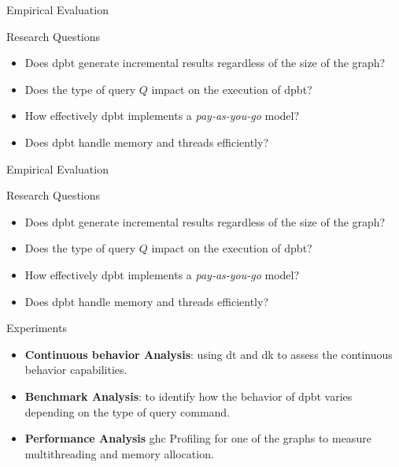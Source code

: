 \begin{frame}[fragile]{Empirical Evaluation}
  \begin{block}{Research Questions}
    \begin{itemize}
        \item Does \acrshort{dpbt} generate incremental results regardless of the size of the graph?
        \item Does the type of query $Q$ impact on the execution of \acrshort{dpbt}?
        \item How effectively \acrshort{dpbt} implements a \emph{pay-as-you-go} model?
        \item Does \acrshort{dpbt} handle memory and threads efficiently?
    \end{itemize}        
  \end{block}
\end{frame}

\begin{frame}[fragile]{Empirical Evaluation}
  \begin{block}{Research Questions}
    \begin{itemize}
        \item Does \acrshort{dpbt} generate incremental results regardless of the size of the graph?
        \item Does the type of query $Q$ impact on the execution of \acrshort{dpbt}?
        \item How effectively \acrshort{dpbt} implements a \emph{pay-as-you-go} model?
        \item Does \acrshort{dpbt} handle memory and threads efficiently?
    \end{itemize}        
  \end{block}
  \begin{block}{Experiments}
    \begin{itemize}
      \item \textbf{Continuous behavior Analysis}: using \acrshort{dt} and \acrshort{dk} to assess the continuous behavior capabilities.
      \item \textbf{Benchmark Analysis}: to identify how the behavior of \acrshort{dpbt} varies depending on the type of query command.
      \item \textbf{Performance Analysis} \acrfull{ghc} Profiling for one of the graphs to measure multithreading and memory allocation. 
    \end{itemize}
  \end{block}
\end{frame}

